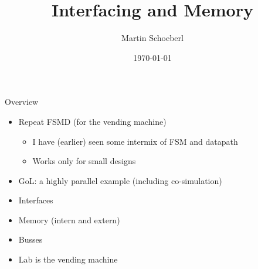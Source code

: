 

\newif\ifbook


\title{Interfacing and Memory}
\author{Martin Schoeberl}
\date{\today}



\begin{frame}
\titlepage
\end{frame}


\begin{frame}[fragile]{Overview}
\begin{itemize}
\item Repeat FSMD (for the vending machine)
\begin{itemize}
\item I have (earlier) seen some intermix of FSM and datapath
\item Works only for small designs
\end{itemize}
\item GoL: a highly parallel example (including co-simulation)
\item Interfaces
\item Memory (intern and extern)

\item Busses
\item Lab is the vending machine
\end{itemize}
\end{frame}



